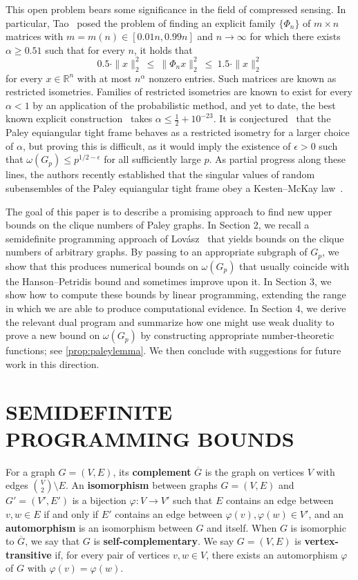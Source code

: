 \documentclass[]{spie}  %
\begin{document}
This open problem bears some significance in the field of compressed sensing.
In particular, Tao~\cite{taoBlog} posed the problem of finding an explicit family $\{\Phi_n\}$ of $m\times n$ matrices with $m=m(n)\in[0.01n,0.99n]$ and $n\to\infty$ for which there exists $\alpha\geq0.51$ such that for every $n$, it holds that
\[
0.5\cdot\|x\|_2^2
~
\leq
~
\|\Phi_nx\|_2^2
~
\leq
~
1.5\cdot\|x\|_2^2
\]
for every $x\in\mathbb{R}^n$ with at most $n^{\alpha}$ nonzero entries.
Such matrices are known as restricted isometries.
Families of restricted isometries are known to exist for every $\alpha<1$ by an application of the probabilistic method, and yet to date, the best known explicit construction~\cite{bourgain11,mixon15} takes $\alpha\leq\frac{1}{2}+10^{-23}$.
It is conjectured~\cite{bandeira17} that the Paley equiangular tight frame behaves as a restricted isometry for a larger choice of $\alpha$, but proving this is difficult, as it would imply the existence of $\epsilon > 0$ such that $\omega(G_p) \leq p^{1/2 - \epsilon}$ for all sufficiently large $p$.
As partial progress along these lines, the authors recently established that the singular values of random subensembles of the Paley equiangular tight frame obey a Kesten--McKay law~\cite{magsino19}.

The goal of this paper is to describe a promising approach to find new upper bounds on the clique numbers of Paley graphs.  In Section 2, we recall a semidefinite programming approach of Lov\'{a}sz~\cite{lovasz79} that yields bounds on the clique numbers of arbitrary graphs.  By passing to an appropriate subgraph of $G_p$, we show that this produces numerical bounds on $\omega(G_p)$ that usually coincide with the Hanson--Petridis bound and sometimes improve upon it.  In Section 3, we show how to compute these bounds by linear programming, extending the range in which we are able to produce computational evidence.  In Section 4, we derive the relevant dual program and summarize how one might use weak duality to prove a new bound on $\omega(G_p)$ by constructing appropriate number-theoretic functions; see \cref{prop:paleylemma}.  We then conclude with suggestions for future work in this direction.



\section{SEMIDEFINITE PROGRAMMING BOUNDS}
For a graph $G = (V,E)$, its \textbf{complement} $\overline{G}$ is the graph on vertices $V$ with edges $\binom{V}{2} \setminus E$.  An \textbf{isomorphism} between graphs $G = (V,E)$ and $G' = (V',E')$ is a bijection $\varphi\colon V \rightarrow V'$ such that $E$ contains an edge between $v,w \in E$ if and only if $E'$ contains an edge between $\varphi(v),\varphi(w) \in V'$, and an \textbf{automorphism} is an isomorphism between $G$ and itself.  When $G$ is isomorphic to $\overline{G}$, we say that $G$ is \textbf{self-complementary}.  We say $G = (V,E)$ is \textbf{vertex-transitive} if, for every pair of vertices $v,w \in V$, there exists an automorphism $\varphi$ of $G$ with $\varphi(v) = \varphi(w)$.
\end{document}
